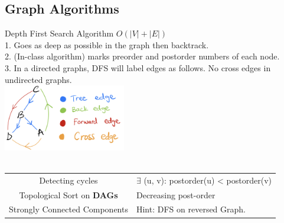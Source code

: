 \documentclass[10pt,a4paper]{article}
\begin{document}
\begin{multicols}{3}
    \section{Graph Algorithms}
    \begin{textbox}{Depth First Search Algorithm}
          $O(|V| + |E|)$ \\
        1. Goes as deep as possible in the graph then backtrack.\\
        2. (In-class algorithm) marks preorder and postorder numbers of each node.\\
        3. In a directed graphs, DFS will label edges as follows. No cross edges in undirected graphs.\\
        \includegraphics[width=0.4\textwidth]{images/dfs-edges.jpeg}\\
        \\
        \begin{tabular}{c|p{}}
            Detecting cycles               & $\exists$ (u, v): postorder(u) < postorder(v) \\
            Topological Sort on {\bf DAGs} & Decreasing post-order                         \\
            Strongly Connected Components  & Hint: DFS on reversed Graph.                  \\
        \end{tabular}\\
    \end{textbox}


\end{multicols}
\end{document}
